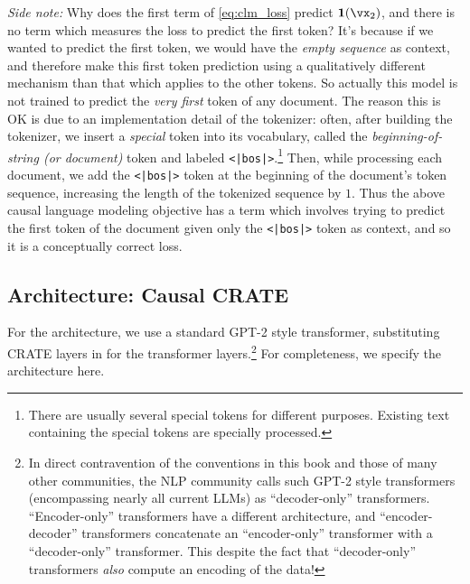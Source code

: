 \documentclass[../../book-main.tex]{subfiles}
\begin{document}
\textit{Side note:} Why does the first term of \eqref{eq:clm_loss} predict \(\vone(\vx_{2})\), and there is no term which measures the loss to predict the first token? It's because if we wanted to predict the first token, we would have the \textit{empty sequence} as context, and therefore make this first token prediction using a qualitatively different mechanism than that which applies to the other tokens. So actually this model is not trained to predict the \textit{very first} token of any document. The reason this is OK is due to an implementation detail of the tokenizer: often, after building the tokenizer, we insert a \textit{special} token into its vocabulary, called the \textit{beginning-of-string (or document)} token and labeled \texttt{<|bos|>}.\footnote{There are usually several special tokens for different purposes. Existing text containing the special tokens are specially processed.} Then, while processing each document, we add the \texttt{<|bos|>} token at the beginning of the document's token sequence, increasing the length of the tokenized sequence by \(1\). Thus the above causal language modeling objective has a term which involves trying to predict the first token of the document given only the \texttt{<|bos|>} token as context, and so it is a conceptually correct loss.

\subsection{Architecture: Causal CRATE}

For the architecture, we use a standard GPT-2 style transformer, substituting CRATE layers in for the transformer layers.\footnote{In direct contravention of the conventions in this book and those of many other communities, the NLP community calls such GPT-2 style transformers (encompassing nearly all current LLMs) as ``decoder-only'' transformers. ``Encoder-only'' transformers have a different architecture, and ``encoder-decoder'' transformers concatenate an ``encoder-only'' transformer with a ``decoder-only'' transformer. This despite the fact that ``decoder-only'' transformers \textit{also} compute an encoding of the data!} For completeness, we specify the architecture here.
\end{document}
